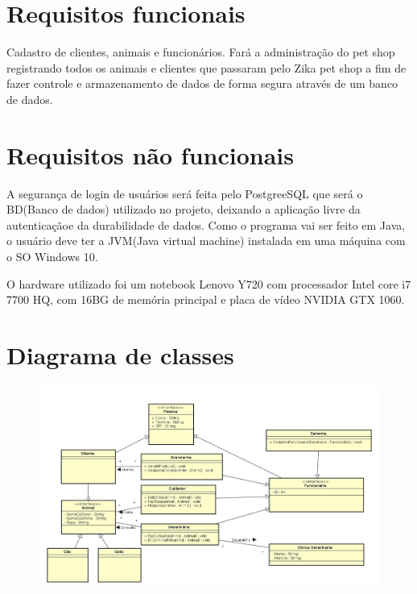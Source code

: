 \documentclass[12pt]{article}
\begin{document}
 \section{Requisitos funcionais}%
 Cadastro de clientes, animais e funcionários. Fará a administração do pet shop registrando todos os animais e clientes que passaram pelo Zika pet shop a fim de fazer controle e armazenamento de dados de forma segura através de um banco de dados.
 
 
 \section{Requisitos não funcionais}%
 A segurança de login de usuários será feita pelo PostgreeSQL que será o BD(Banco de dados) utilizado no projeto, deixando a aplicação livre da autenticaçãoe da durabilidade de dados. Como o programa vai ser feito em Java, o usuário deve ter a JVM(Java virtual machine) instalada em uma máquina com o SO Windows 10.
 
 O hardware utilizado foi um notebook Lenovo Y720 com processador Intel core i7 7700 HQ, com 16BG de memória principal e placa de vídeo NVIDIA GTX 1060.
 
 

 \section{Diagrama de classes}
 \begin{flushleft}
 
 \begin{figure}[!h]
     \centering
     \includegraphics[scale=0.43,angle=90]{Diagrama.jpg}
\end{figure}
 \end{flushleft} 
\end{document}
